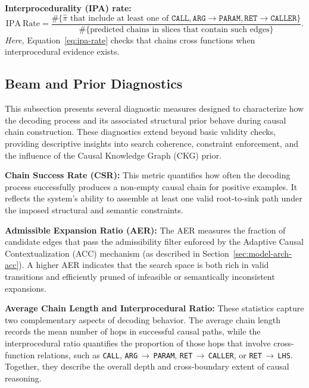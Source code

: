 \documentclass{buthesis}
\begin{document}
\textbf{Interprocedurality (IPA) rate:}
\begin{equation}
\label{eq:ipa-rate}
\mathrm{IPA\ Rate}=
\frac{\#\{\hat{\pi}\text{ that include at least one of }
\texttt{CALL},\texttt{ARG}\!\to\!\texttt{PARAM},
\texttt{RET}\!\to\!\texttt{CALLER}\}}
{\#\{\text{predicted chains in slices that contain such edges}\}}.
\end{equation}
\textit{Here,} Equation~\eqref{eq:ipa-rate} checks that chains cross functions when interprocedural evidence exists.

\subsection{Beam and Prior Diagnostics}
\label{subsec:beam-prior-diag}

This subsection presents several diagnostic measures designed to characterize how the decoding process and its associated structural prior behave during causal chain construction. These diagnostics extend beyond basic validity checks, providing descriptive insights into search coherence, constraint enforcement, and the influence of the Causal Knowledge Graph (CKG) prior.

\textbf{Chain Success Rate (CSR):}
This metric quantifies how often the decoding process successfully produces a non-empty causal chain for positive examples. It reflects the system’s ability to assemble at least one valid root-to-sink path under the imposed structural and semantic constraints.

\textbf{Admissible Expansion Ratio (AER):}
The AER measures the fraction of candidate edges that pass the admissibility filter enforced by the Adaptive Causal Contextualization (ACC) mechanism (as described in Section~\ref{sec:model-arch-acc}). A higher AER indicates that the search space is both rich in valid transitions and efficiently pruned of infeasible or semantically inconsistent expansions.

\textbf{Average Chain Length and Interprocedural Ratio:}
These statistics capture two complementary aspects of decoding behavior. The average chain length records the mean number of hops in successful causal paths, while the interprocedural ratio quantifies the proportion of those hops that involve cross-function relations, such as \texttt{CALL}, \texttt{ARG}\,$\rightarrow$\,\texttt{PARAM}, \texttt{RET}\,$\rightarrow$\,\texttt{CALLER}, or \texttt{RET}\,$\rightarrow$\,\texttt{LHS}. Together, they describe the overall depth and cross-boundary extent of causal reasoning.
\end{document}
